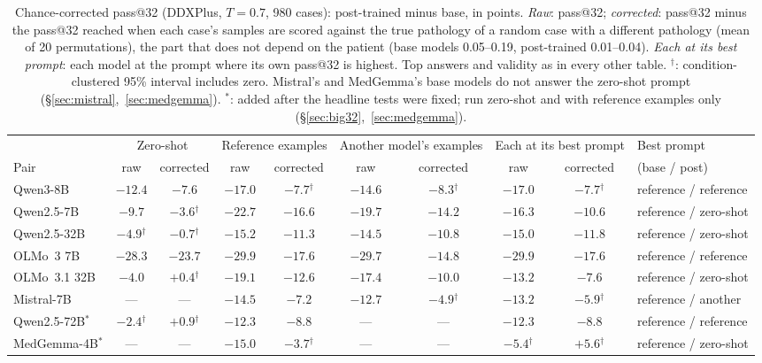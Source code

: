 \documentclass[wcp]{jmlr}
\begin{document}
\begin{table}[t]
\centering\small
\setlength{\tabcolsep}{3.5pt}
\begin{adjustbox}{max width=\linewidth}
\begin{tabular}{lccccccccl}
\toprule
 & \multicolumn{2}{c}{Zero-shot} & \multicolumn{2}{c}{Reference examples} & \multicolumn{2}{c}{Another model's examples} & \multicolumn{2}{c}{Each at its best prompt} & Best prompt \\
Pair & raw & corrected & raw & corrected & raw & corrected & raw & corrected & (base / post) \\
\midrule
Qwen3-8B & $-12.4$ & $-7.6$ & $-17.0$ & $-7.7$$^{\dagger}$ & $-14.6$ & $-8.3$$^{\dagger}$ & $-17.0$ & $-7.7$$^{\dagger}$ & reference / reference \\
Qwen2.5-7B & $-9.7$ & $-3.6$$^{\dagger}$ & $-22.7$ & $-16.6$ & $-19.7$ & $-14.2$ & $-16.3$ & $-10.6$ & reference / zero-shot \\
Qwen2.5-32B & $-4.9$$^{\dagger}$ & $-0.7$$^{\dagger}$ & $-15.2$ & $-11.3$ & $-14.5$ & $-10.8$ & $-15.0$ & $-11.8$ & reference / zero-shot \\
OLMo~3 7B & $-28.3$ & $-23.7$ & $-29.9$ & $-17.6$ & $-29.7$ & $-14.8$ & $-29.9$ & $-17.6$ & reference / reference \\
OLMo~3.1 32B & $-4.0$ & $+0.4$$^{\dagger}$ & $-19.1$ & $-12.6$ & $-17.4$ & $-10.0$ & $-13.2$ & $-7.6$ & reference / zero-shot \\
Mistral-7B & --- & --- & $-14.5$ & $-7.2$ & $-12.7$ & $-4.9$$^{\dagger}$ & $-13.2$ & $-5.9$$^{\dagger}$ & reference / another \\
Qwen2.5-72B$^{*}$ & $-2.4$$^{\dagger}$ & $+0.9$$^{\dagger}$ & $-12.3$ & $-8.8$ & --- & --- & $-12.3$ & $-8.8$ & reference / reference \\
MedGemma-4B$^{*}$ & --- & --- & $-15.0$ & $-3.7$$^{\dagger}$ & --- & --- & $-5.4$$^{\dagger}$ & $+5.6$$^{\dagger}$ & reference / zero-shot \\
\bottomrule
\end{tabular}
\end{adjustbox}
\caption{Chance-corrected pass@32 (DDXPlus, $T{=}0.7$, 980 cases): post-trained minus base, in points. \emph{Raw}: pass@32; \emph{corrected}: pass@32 minus the pass@32 reached when each case's samples are scored against the true pathology of a random case with a different pathology (mean of 20 permutations), the part that does not depend on the patient (base models 0.05--0.19, post-trained 0.01--0.04). \emph{Each at its best prompt}: each model at the prompt where its own pass@32 is highest. Top answers and validity as in every other table. $^{\dagger}$: condition-clustered 95\% interval includes zero. Mistral's and MedGemma's base models do not answer the zero-shot prompt (\S\ref{sec:mistral},~\ref{sec:medgemma}). $^{*}$: added after the headline tests were fixed; run zero-shot and with reference examples only (\S\ref{sec:big32},~\ref{sec:medgemma}).}
\label{tab:chance}
\end{table}
\end{document}
